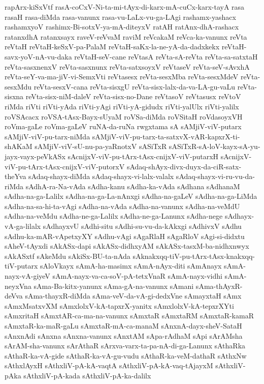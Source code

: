 {rapArx-kiSxVtf
rasA-coCxV-Ni-ta-mi-tAyx-di-karx-mA-cuCx-karx-tayA
rasa
rasaH
rasa-diMda
rasa-vanunx
rasa-vu-LaLx-vu-ga-LAgi
rashamx-yashacx
rashamxyoV
rashimx-Bi-sotxV-ya-mA-diteyxV
ratAH
ratAnx-dhA-rashacx
ratanxdhA
ratanxsayx
raveV-reVvaM
raviM
reVcakaM
reVca-ka-vanunx
reVta
reVtaH
reVtaH-keSxV-pa-PalaM
reVtaH-saKx-la-ne-yA-da-dadxkekx
reVtaH-savx-yoV-nA-vu-daka
reVtaH-seV-cane
reVtasA
reVta-sA-reVta
reVta-sa-satxtaH
reVta-sasxnenxV
reVta-sasxnunx
reVta-satxsoyxV
reVtaseV
reVta-seV-sAvxhA
reVta-seY-va-ma-jiV-vi-SemxVti
reVtasesx
reVta-sesxMba
reVta-sesxMdeV
reVta-sesxMdu
reVta-sesxV-cana
reVta-sisxgU
reVta-sisx-lalx-da-va-LA-gu-vaLu
reVta-sisxna
reVta-sisx-niM-daleV
reVta-sisx-no-Dane
reVtasoV
reVtasusx
reVtoV
riMda
riVti
riVti-yAda
riVti-yAgi
riVti-yA-gidudx
riVti-yalUlx
riVti-yalilx
roVSAcacx
roVSA-tAsx-Bayx-sUyaM
roVSa-diMda
roVSitaH
roVdasoyxVH
roVma-gaLe
roVma-gaLeV
ruNA-da-ruNa
rwgxtama
sA
sAMjiV-viV-putarx
sAMjiV-viV-pu-tarx-niMda
sAMjiV-viV-pu-tarx-ta-satxvX-vAR-kapxrX-ti-shAKaM
sAMjiV-viV-sU-nu-pa-yaRnotxV
sASiTxR
sASiTxR-sA-loV-kayx-sA-yu-jayx-vayx-peVkASx
sAcnijxV-viV-pu-tArx-tAsx-cnijxV-viV-putarxH
sAcnijxV-viV-pu-tArx-tAsx-cnijxV-viV-putorxV
sAdaq-shAyx-divx-duyx-da-ciR-satx-theYva
sAdaq-shayx-diMda
sAdaq-shayx-vi-lalx-valalx
sAdaq-shayx-vi-ru-vu-da-riMda
sAdhA-ra-Na-vAda
sAdha-kanu
sAdha-ka-vAda
sAdhana
sAdhanaM
sAdha-na-ga-Lalilx
sAdha-na-ga-La-nAnxgi
sAdha-na-gaLeV
sAdha-na-ga-LiMda
sAdha-na-sa-hi-ta-vAgi
sAdha-na-vAda
sAdha-na-vanunx
sAdha-na-veMdU
sAdha-na-veMdu
sAdha-ne-ga-Lalilx
sAdha-ne-ga-Lanunx
sAdha-nege
sAdhayx-vA-ga-lilalx
sAdhayxvU
sAdhi-situ
sAdhi-su-vu-da-kAkxgi
sAdhivxV
sAdhu
sAdhu-ka-mAR-vApetxyXY
sAdhu-vAgi
sAgaRlaH
sAgaRloV
sAgi-si-didxtu
sAheV-tAyxdi
sAkASx-dapi
sAkASx-didhxyAM
sAkASx-tasxM-ba-nidhxnwyx
sAkASxtf
sAkeMdu
sAkiSx-BU-ta-nAda
sAknakxqq-tiV-pu-tArx-tAsx-knakxqq-tiV-putarx
sAloVkayx
sAmA-ha-masimx
sAmA-nAyx-diti
sAmAnayx
sAmA-nayx-vA-giyeV
sAmA-nayx-va-ca-soV-pA-tetxVnaR
sAmA-nayx-vidhi
sAmA-neyxVna
sAma-Ba-kitx-yanunx
sAma-gA-na-vanunx
sAmani
sAma-thAyxR-deVva
sAma-thayxR-diMda
sAma-veV-da-vA-gi-dedxVne
sAmayxtaH
sAmx
sAmxMsatxvXM
sAmxlolxV-kA-tapxrX-yanitx
sAmxlolxV-kA-tepxrXYti
sAmxritaH
sAmxtAR-ca-ma-na-vanunx
sAmxtaR
sAmxtaRM
sAmxtaR-kamaR
sAmxtaR-ka-maR-gaLu
sAmxtaR-mA-ca-manaM
sAnxnA-dayx-sheV-SataH
sAnxnAdi
sAnxna
sAnxna-vanunx
sAnxtAM
sApa-rAdhaM
sApi
sArAMsha
sArAM-sha-vanunx
sArAthaR
sArxva-varx-ta-pa-nA-di-ga-Lanunx
sAthaRka
sAthaR-ka-vA-gide
sAthaR-ka-vA-gu-vudu
sAthaR-ka-veM-dathaR
sAthxNw
sAthxlAyxH
sAthxliV-pA-kA-vaqtA
sAthxliV-pA-kA-vaq-tAjayxM
sAthxliV-pAka
sAthxliV-pA-kada
sAthxliV-pA-ka-dalilx
}
